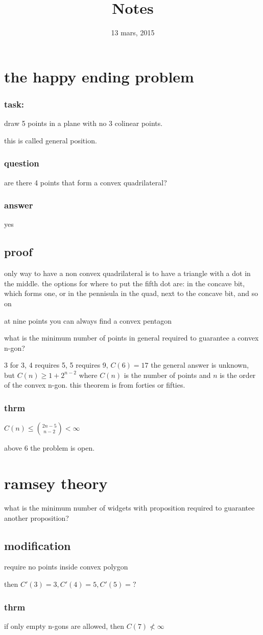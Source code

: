\documentclass[letterpaper]{article}
\begin{document}
\title{Notes}
\date{13 mars, 2015}
\maketitle
\section*{the happy ending problem}
\subsubsection*{task:}
draw 5 points in a plane with no 3 colinear points.

this is called general position.

\subsubsection*{question}
are there 4 points that form a convex quadrilateral?

\subsubsection*{answer}
yes

\subsection*{proof}
only way to have a non convex quadrilateral is to have a triangle with a dot in the middle. the options for where to put the fifth dot are: in the concave bit, which forms one, or in the pennisula in the quad, next to the concave bit, and so on

at nine points you can always find a convex pentagon

what is the minimum number of points in general required to guarantee a convex n-gon?

3 for 3, 4 requires 5, 5 requires 9, $C(6)=17$ the general answer is unknown, but $C(n)\ge 1+2^{n-2}$ where $C(n)$ is the number of points and $n$ is the order of the convex n-gon. this theorem is from forties or fifties.

\subsubsection*{thrm}
$C(n)\le \binom{2n-5}{n-2}<\infty$

above 6 the problem is open.


\section*{ramsey theory}
what is the minimum number of widgets with proposition required to guarantee another proposition?

\subsection*{modification}
require no points inside convex polygon

then $C'(3)=3, C'(4)=5, C'(5)=?$

\subsubsection*{thrm}
if only empty n-gons are allowed, then $C(7)\not<\infty$
\end{document}
